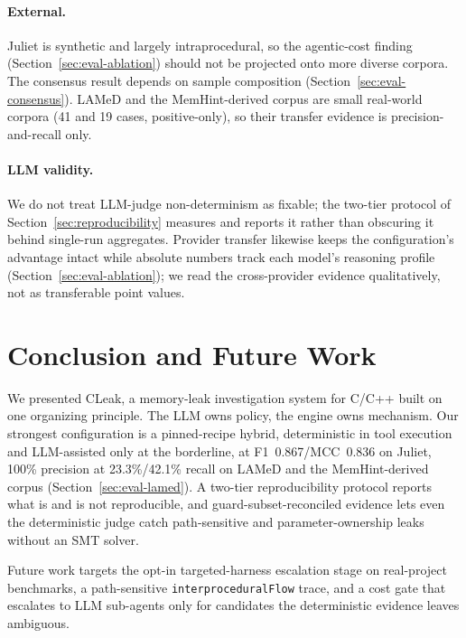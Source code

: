 \documentclass[a4paper]{llncs}
\begin{document}
\paragraph{External.}
Juliet is synthetic and largely intraprocedural, so the agentic-cost finding
(Section~\ref{sec:eval-ablation}) should not be projected onto more
diverse corpora. The consensus result depends on sample composition
(Section~\ref{sec:eval-consensus}). LAMeD and the MemHint-derived corpus
are small real-world corpora (41 and 19 cases, positive-only), so their
transfer evidence is precision-and-recall only.

\paragraph{LLM validity.}
We do not treat LLM-judge non-determinism as
fixable; the two-tier protocol of Section~\ref{sec:reproducibility}
measures and reports it rather than obscuring it behind single-run
aggregates. Provider transfer likewise keeps the configuration's
advantage intact while absolute numbers track each model's reasoning
profile (Section~\ref{sec:eval-ablation}); we read the cross-provider
evidence qualitatively, not as transferable point values.

\section{Conclusion and Future Work}

We presented CLeak, a memory-leak investigation system for C/C++ built
on one organizing principle. The LLM owns policy, the engine owns
mechanism. Our strongest configuration is a pinned-recipe hybrid,
deterministic in tool execution and LLM-assisted only at the
borderline, at F1~0.867/MCC~0.836 on Juliet, 100\% precision at
23.3\%/42.1\% recall on LAMeD and the MemHint-derived corpus
(Section~\ref{sec:eval-lamed}). A two-tier reproducibility protocol
reports what is and is not reproducible, and guard-subset-reconciled
evidence lets even the deterministic judge catch path-sensitive and
parameter-ownership leaks without an SMT solver.

Future work targets the opt-in targeted-harness escalation stage on
real-project benchmarks, a path-sensitive \texttt{interproceduralFlow}
trace, and a cost gate that escalates to LLM sub-agents only for
candidates the deterministic evidence leaves ambiguous.

\label{page:lastcontent}
\end{document}
